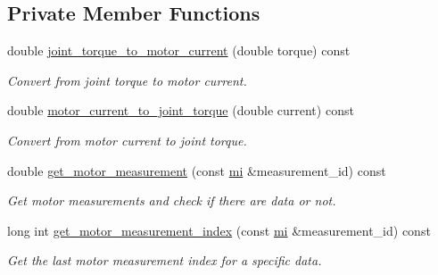 \subsection*{Private Member Functions}
\begin{DoxyCompactItemize}
\item 
double \hyperlink{classblmc__robots_1_1BlmcJointModule_aff3adcd9f9464cf5ac99ea9a7b9cc4f7}{joint\+\_\+torque\+\_\+to\+\_\+motor\+\_\+current} (double torque) const 
\begin{DoxyCompactList}\small\item\em Convert from joint torque to motor current. \end{DoxyCompactList}\item 
double \hyperlink{classblmc__robots_1_1BlmcJointModule_a3738cf7ae73ebec429a436a4a308055c}{motor\+\_\+current\+\_\+to\+\_\+joint\+\_\+torque} (double current) const 
\begin{DoxyCompactList}\small\item\em Convert from motor current to joint torque. \end{DoxyCompactList}\item 
double \hyperlink{classblmc__robots_1_1BlmcJointModule_a492050b8dc111987644a7104cd0477c8}{get\+\_\+motor\+\_\+measurement} (const \hyperlink{common__header_8hpp_a1975c6bb47bc85dfc8edfe349c30dae1}{mi} \&measurement\+\_\+id) const 
\begin{DoxyCompactList}\small\item\em Get motor measurements and check if there are data or not. \end{DoxyCompactList}\item 
long int \hyperlink{classblmc__robots_1_1BlmcJointModule_a698eb05cc24c4261883a3f6b1c3799ef}{get\+\_\+motor\+\_\+measurement\+\_\+index} (const \hyperlink{common__header_8hpp_a1975c6bb47bc85dfc8edfe349c30dae1}{mi} \&measurement\+\_\+id) const 
\begin{DoxyCompactList}\small\item\em Get the last motor measurement index for a specific data. \end{DoxyCompactList}\end{DoxyCompactItemize}
